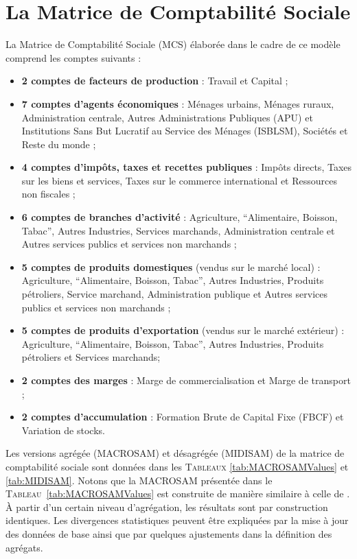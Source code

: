 \documentclass[11pt,a4paper]{article}
\begin{document}
	\section{La Matrice de Comptabilité Sociale}
	La Matrice de Comptabilité Sociale (MCS) élaborée dans le cadre de ce modèle comprend les comptes suivants :
	\begin{itemize}
		\item[$\bullet$] \textbf{2 comptes de facteurs de production} : Travail et Capital ;
		\item[$\bullet$] \textbf{7 comptes d’agents économiques} : Ménages urbains, Ménages ruraux, Administration centrale, Autres Administrations Publiques (APU) et Institutions Sans But Lucratif au Service des Ménages (ISBLSM), Sociétés et Reste du monde ;
		\item[$\bullet$] \textbf{4 comptes d'impôts, taxes et recettes publiques} : Impôts directs, Taxes sur les biens et services, Taxes sur le commerce international et Ressources non fiscales ;
		\item[$\bullet$] \textbf{6 comptes de branches d’activité} : Agriculture, ``Alimentaire, Boisson, Tabac'', Autres Industries, Services marchands, Administration centrale et Autres services publics et services non marchands ;
		\item[$\bullet$] \textbf{5 comptes de produits domestiques} (vendus sur le marché local) : Agriculture, ``Alimentaire, Boisson, Tabac'', Autres Industries, Produits pétroliers, Service marchand, Administration publique et Autres services publics et services non marchands ;
		\item[$\bullet$] \textbf{5 comptes de produits d’exportation} (vendus sur le marché extérieur) : Agriculture, ``Alimentaire, Boisson, Tabac'', Autres Industries, Produits pétroliers et Services marchands;
		\item[$\bullet$] \textbf{2 comptes des marges} : Marge de commercialisation et Marge de transport ;
		\item[$\bullet$] \textbf{2 comptes d’accumulation} : Formation Brute de Capital Fixe (FBCF) et Variation de stocks.
	\end{itemize}
	
	Les versions agrégée (MACROSAM) et désagrégée (MIDISAM) de la matrice de comptabilité sociale sont données dans les \textsc{Tableaux} \ref{tab:MACROSAMValues} et \ref{tab:MIDISAM}. Notons que la MACROSAM présentée dans le \textsc{Tableau}~\ref{tab:MACROSAMValues} est construite de manière similaire à celle de \cite{Ramaharo2022}. À partir d'un certain niveau d'agrégation, les résultats sont par construction identiques. Les  divergences statistiques peuvent être expliquées par la mise à jour des données de base ainsi que par quelques ajustements dans la définition des agrégats.
		
\end{document}
